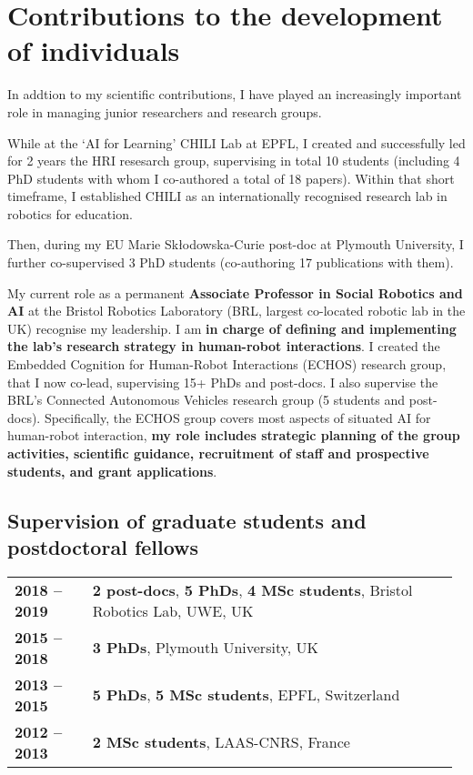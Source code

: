 \vspace{2em}
\section{Contributions to the development of individuals}

In addtion to my scientific contributions, I have played an increasingly
important role in managing junior researchers and research groups.

While at the `AI for Learning' CHILI Lab at EPFL, I created and successfully
led for 2 years the HRI resesarch group, supervising in total
10 students (including 4 PhD students with whom I co-authored a total of 18
papers). Within that short timeframe, I established CHILI as an internationally
recognised research lab in robotics for education. 

Then, during my EU Marie Skłodowska-Curie post-doc at Plymouth University, I
further co-supervised 3 PhD students (co-authoring 17 publications with them).

My current role as a permanent \textbf{Associate Professor in Social Robotics
and AI} at the Bristol Robotics Laboratory (BRL, largest co-located robotic lab
in the UK) recognise my leadership. I am \textbf{in charge of defining and
implementing the lab's research strategy in human-robot interactions}. I created
the Embedded Cognition for Human-Robot Interactions (ECHOS) research group, that
I now co-lead, supervising 15+ PhDs and post-docs. I also supervise the BRL's
Connected Autonomous Vehicles research group (5 students and post-docs).
Specifically, the ECHOS group covers most aspects of situated AI for human-robot
interaction, \textbf{my role includes strategic planning of the group
activities, scientific guidance, recruitment of staff and prospective students,
and grant applications}.

\subsection{Supervision of graduate students and postdoctoral fellows}

\begin{tabular}{p{0.17\linewidth}p{0.8\linewidth}}
    \bf 2018 -- 2019 & \textbf{2 post-docs}, \textbf{5 PhDs}, \textbf{4 MSc students}, Bristol Robotics Lab, UWE, UK \\
    \bf 2015 -- 2018 & \textbf{3 PhDs}, Plymouth University, UK \\
    \bf 2013 -- 2015 & \textbf{5 PhDs}, \textbf{5 MSc students}, EPFL, Switzerland \\
    \bf 2012 -- 2013 & \textbf{2 MSc students}, LAAS-CNRS, France \\
\end{tabular}


